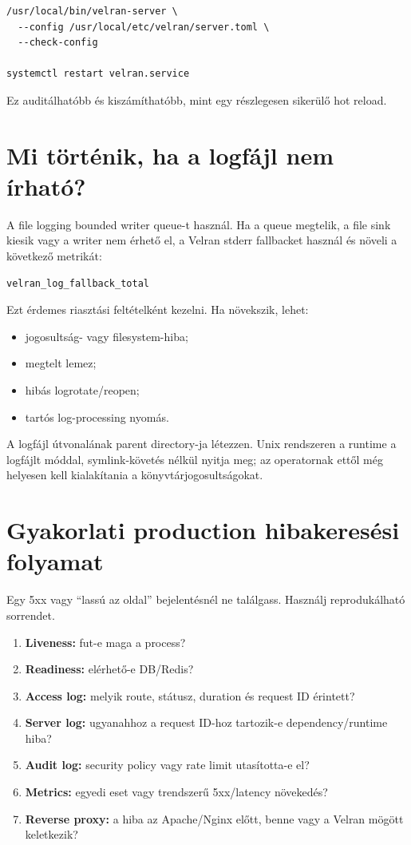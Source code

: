 \begin{lstlisting}
/usr/local/bin/velran-server \
  --config /usr/local/etc/velran/server.toml \
  --check-config

systemctl restart velran.service
\end{lstlisting}

Ez auditálhatóbb és kiszámíthatóbb, mint egy részlegesen sikerülő hot reload.

\section{Mi történik, ha a logfájl nem írható?}

A file logging bounded writer queue-t használ. Ha a queue megtelik, a file sink kiesik vagy a writer nem érhető el, a Velran stderr fallbacket használ és növeli a következő metrikát:

\begin{lstlisting}
velran_log_fallback_total
\end{lstlisting}

Ezt érdemes riasztási feltételként kezelni. Ha növekszik, lehet:

\begin{itemize}
  \item jogosultság- vagy filesystem-hiba;
  \item megtelt lemez;
  \item hibás logrotate/reopen;
  \item tartós log-processing nyomás.
\end{itemize}

A logfájl útvonalának parent directory-ja létezzen. Unix rendszeren a runtime a logfájlt  móddal, symlink-követés nélkül nyitja meg; az operatornak ettől még helyesen kell kialakítania a könyvtárjogosultságokat.

\section{Gyakorlati production hibakeresési folyamat}

Egy 5xx vagy ``lassú az oldal'' bejelentésnél ne találgass. Használj reprodukálható sorrendet.

\begin{enumerate}
  \item \textbf{Liveness:} fut-e maga a process?
  \item \textbf{Readiness:} elérhető-e DB/Redis?
  \item \textbf{Access log:} melyik route, státusz, duration és request ID érintett?
  \item \textbf{Server log:} ugyanahhoz a request ID-hoz tartozik-e dependency/runtime hiba?
  \item \textbf{Audit log:} security policy vagy rate limit utasította-e el?
  \item \textbf{Metrics:} egyedi eset vagy trendszerű 5xx/latency növekedés?
  \item \textbf{Reverse proxy:} a hiba az Apache/Nginx előtt, benne vagy a Velran mögött keletkezik?
\end{enumerate}

